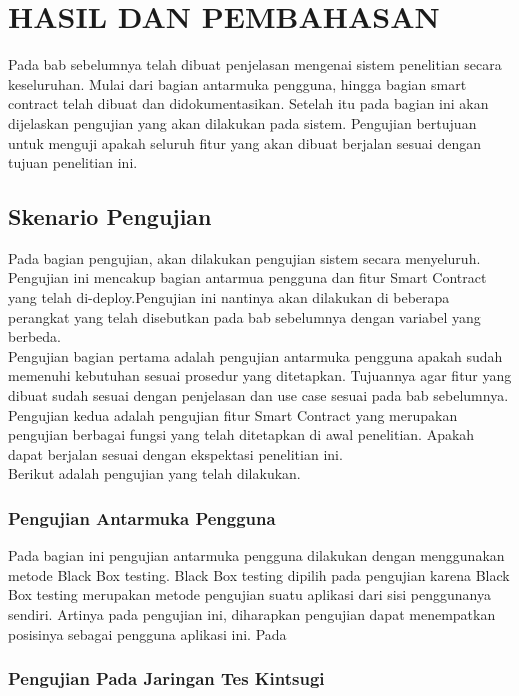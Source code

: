 \chapter{HASIL DAN PEMBAHASAN}
\label{chap:hasilpembahasan}

Pada bab sebelumnya telah dibuat penjelasan mengenai sistem penelitian secara keseluruhan. Mulai dari bagian antarmuka pengguna, hingga bagian smart contract telah dibuat dan didokumentasikan. Setelah itu pada bagian ini akan dijelaskan pengujian yang akan dilakukan pada sistem. Pengujian bertujuan untuk menguji apakah seluruh fitur yang akan dibuat berjalan sesuai dengan tujuan penelitian ini.

\section{Skenario Pengujian}
\label{sec:skenariopengujian}

Pada bagian pengujian, akan dilakukan pengujian sistem secara menyeluruh. Pengujian ini mencakup bagian antarmua pengguna dan fitur Smart Contract yang telah di-deploy.Pengujian ini nantinya akan dilakukan di beberapa perangkat yang telah disebutkan pada bab sebelumnya dengan variabel yang berbeda. \\
Pengujian bagian pertama adalah pengujian antarmuka pengguna apakah sudah memenuhi kebutuhan sesuai prosedur yang ditetapkan. Tujuannya agar fitur yang dibuat sudah sesuai dengan penjelasan dan use case sesuai pada bab sebelumnya.
Pengujian kedua adalah pengujian fitur Smart Contract yang merupakan pengujian berbagai fungsi yang telah ditetapkan di awal penelitian. Apakah dapat berjalan sesuai dengan ekspektasi penelitian ini.\\
Berikut adalah pengujian yang telah dilakukan.

\subsection{Pengujian Antarmuka Pengguna}
\label{subsec:ujiuiux}

Pada bagian ini pengujian antarmuka pengguna dilakukan dengan menggunakan metode Black Box testing. Black Box testing dipilih pada pengujian karena Black Box testing merupakan metode pengujian suatu aplikasi dari sisi penggunanya sendiri. Artinya pada pengujian ini, diharapkan pengujian dapat menempatkan posisinya sebagai pengguna aplikasi ini. Pada

\subsection{Pengujian Pada Jaringan Tes Kintsugi}
\label{subsec:teskintsugi}

